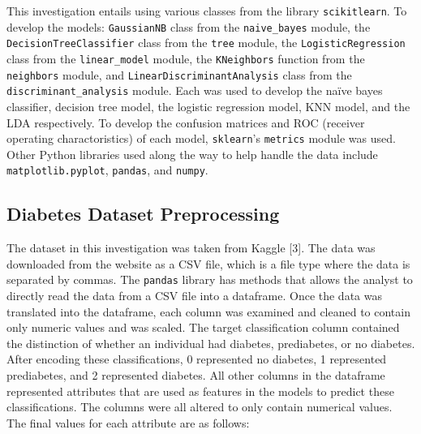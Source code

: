 \documentclass[journal]{IEEEtran}
\begin{document}
This investigation entails using various classes from the library \lstinline{scikitlearn}. To develop the models: \lstinline{GaussianNB} class from the \lstinline{naive_bayes} module, the \lstinline{DecisionTreeClassifier} class from the \lstinline{tree} module, the \lstinline{LogisticRegression} class from the \lstinline{linear_model} module, the \lstinline{KNeighbors} function from the \lstinline{neighbors} module, and \lstinline{LinearDiscriminantAnalysis} class from the \lstinline{discriminant_analysis} module. Each was used to develop the naïve bayes classifier, decision tree model, the logistic regression model, KNN model, and the LDA respectively. To develop the confusion matrices and ROC (receiver operating charactoristics) of each model,  \lstinline{sklearn}'s \lstinline{metrics} module was used. Other Python libraries used along the way to help handle the data include \lstinline{matplotlib.pyplot}, \lstinline{pandas}, and \lstinline{numpy}. 

\subsection{Diabetes Dataset Preprocessing}

The dataset in this investigation was taken from Kaggle [3]. The data was downloaded from the website as a CSV file, which is a file type where the data is separated by commas. The \lstinline{pandas} library has methods that allows the analyst to directly read the data from a CSV file into a dataframe. Once the data was translated into the dataframe, each column was examined and cleaned to contain only numeric values and was scaled. The target classification column contained the distinction of whether an individual had diabetes, prediabetes, or no diabetes. After encoding these classifications, 0 represented no diabetes, 1 represented prediabetes, and 2 represented diabetes. All other columns in the dataframe represented attributes that are used as features in the models to predict these classifications. The columns were all altered to only contain numerical values. The final values for each attribute are as follows: 
\end{document}

